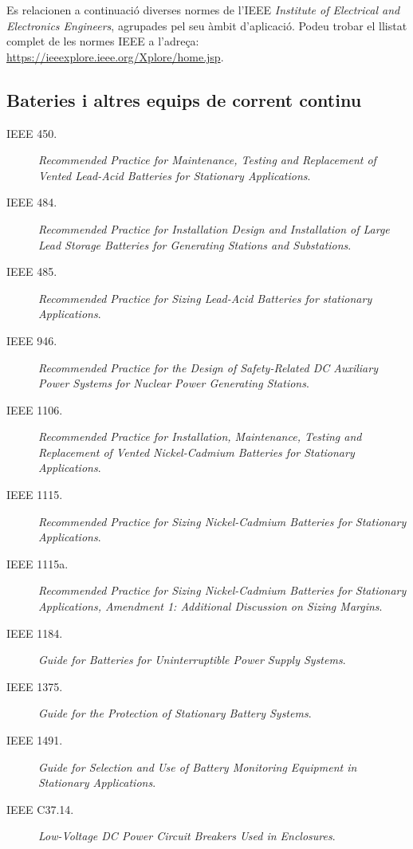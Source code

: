 Es relacionen a continuació diverses normes de l'IEEE \textit{Institute of Electrical and Electronics Engineers}, agrupades pel seu àmbit d'aplicació. Podeu trobar el llistat complet de les normes IEEE a l'adreça: \href{https://ieeexplore.ieee.org/Xplore/home.jsp}{https:/\!\!/ieeexplore.ieee.org/Xplore/home.jsp}.

\subsection*{Bateries i altres equips de corrent continu}
\begin{description}
	\item [\hspace{5mm}IEEE 450.] \textit{Recommended Practice for  Maintenance, Testing and Replacement of Vented Lead-Acid Batteries for Stationary Applications}.
	\item [\hspace{5mm}IEEE 484.] \textit{Recommended Practice for Installation Design and Installation of Large Lead Storage Batteries for Generating Stations and Substations}.
	\item [\hspace{5mm}IEEE 485.] \textit{Recommended Practice for Sizing Lead-Acid Batteries for stationary Applications}.
	\item [\hspace{5mm}IEEE 946.] \textit{Recommended Practice for the Design of Safety-Related DC Auxiliary Power Systems for Nuclear Power Generating Stations}.
	\item [\hspace{5mm}IEEE 1106.] \textit{Recommended Practice for Installation, Maintenance, Testing and Replacement of Vented Nickel-Cadmium Batteries for Stationary Applications}.
	\item [\hspace{5mm}IEEE 1115.] \textit{Recommended Practice for Sizing Nickel-Cadmium Batteries for Stationary Applications}.
	\item [\hspace{5mm}IEEE 1115a.] \textit{Recommended Practice for Sizing Nickel-Cadmium Batteries for Stationary Applications, Amendment 1: Additional Discussion on Sizing Margins}.
	\item [\hspace{5mm}IEEE 1184.] \textit{Guide for Batteries for Uninterruptible Power Supply Systems}.
	\item [\hspace{5mm}IEEE 1375.] \textit{Guide for the Protection of Stationary Battery Systems}.
	\item [\hspace{5mm}IEEE 1491.] \textit{Guide for Selection and Use of Battery Monitoring Equipment in Stationary Applications}.
	\item [\hspace{5mm}IEEE C37.14.] \textit{Low-Voltage DC Power Circuit Breakers Used in Enclosures}.
\end{description}


